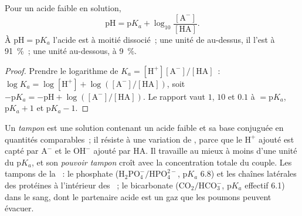 \begin{theorem}\label{thm:b1:water-small-molecules:hh}
Pour un acide faible en solution,
\[
\mathrm{pH} = \mathrm{p}K_a + \log_{10}\frac{[\mathrm{A^-}]}{[\mathrm{HA}]} .
\]
À $\mathrm{pH} = \mathrm{p}K_a$ l'acide est à moitié dissocié~; une
unité de  au-dessus, il l'est à \qty{91}{\%}~; une unité au-dessous, à
\qty{9}{\%}.
\end{theorem}
\begin{proof}
Prendre le logarithme de $K_a = [\mathrm{H^+}][\mathrm{A^-}]/[\mathrm{HA}]$~:
$\log K_a = \log[\mathrm{H^+}] + \log([\mathrm{A^-}]/[\mathrm{HA}])$,
soit $-\mathrm{p}K_a = -\mathrm{pH} + \log([\mathrm{A^-}]/[\mathrm{HA}])$.
Le rapport vaut $1$, $10$ et $0.1$ à  $= \mathrm{p}K_a$, $\mathrm{p}K_a + 1$
et $\mathrm{p}K_a - 1$.
\end{proof}

\begin{definition}[Tampon]\label{def:b1:water-small-molecules:buffer}
Un \emph{tampon} est une solution contenant un acide
faible et sa base conjuguée en quantités comparables~; il résiste à une
variation de , parce que le $\mathrm{H^+}$ ajouté est capté par
$\mathrm{A^-}$ et le $\mathrm{OH^-}$ ajouté par $\mathrm{HA}$. Il
travaille au mieux à moins d'une unité du p$K_a$, et son \emph{pouvoir
tampon} croît avec la concentration totale du couple. Les tampons de la
~: le phosphate
($\mathrm{H_2PO_4^-}/\mathrm{HPO_4^{2-}}$, p$K_a$ 6.8) et les chaînes
latérales des protéines à l'intérieur des ~; le bicarbonate
($\mathrm{CO_2}/\mathrm{HCO_3^-}$, p$K_a$ effectif 6.1) dans le sang,
dont le partenaire acide est un gaz que les poumons peuvent évacuer.
\end{definition}

